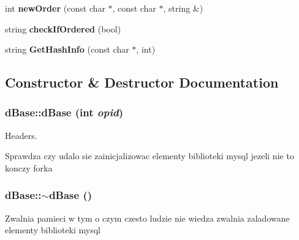 \begin{DoxyCompactItemize}
\item 
\hypertarget{classdBase_adb58d468160d6c498b08bdc2ca5e023e}{
int {\bfseries newOrder} (const char $\ast$, const char $\ast$, string \&)}
\label{classdBase_adb58d468160d6c498b08bdc2ca5e023e}

\item 
\hypertarget{classdBase_a2d01930e89fba0728272e7dac7ffea6e}{
string {\bfseries checkIfOrdered} (bool)}
\label{classdBase_a2d01930e89fba0728272e7dac7ffea6e}

\item 
\hypertarget{classdBase_a8de8d27b4eb83725f8dc3e470f3b2af5}{
string {\bfseries GetHashInfo} (const char $\ast$, int)}
\label{classdBase_a8de8d27b4eb83725f8dc3e470f3b2af5}

\end{DoxyCompactItemize}


\subsection{Constructor \& Destructor Documentation}
\hypertarget{classdBase_aa6b988b284296519d767b538c201f3d7}{
\subsubsection[{dBase}]{\setlength{\rightskip}{0pt plus 5cm}dBase::dBase (int {\em opid})}}
\label{classdBase_aa6b988b284296519d767b538c201f3d7}


Headers. 



Sprawdza czy udalo sie zainicjalizowac elementy biblioteki mysql jezeli nie to konczy forka 

\hypertarget{classdBase_a91351d88d15c348fdfb3ef93be1c20d7}{
\subsubsection[{$\sim$dBase}]{\setlength{\rightskip}{0pt plus 5cm}dBase::$\sim$dBase ()}}
\label{classdBase_a91351d88d15c348fdfb3ef93be1c20d7}


Zwalnia pamieci w tym o czym czesto ludzie nie wiedza zwalnia zaladowane elementy biblioteki mysql 



